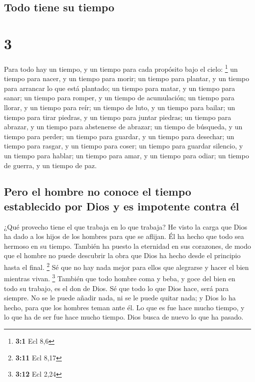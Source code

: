 \hypertarget{todo-tiene-su-tiempo}{%
\subsection{Todo tiene su tiempo}\label{todo-tiene-su-tiempo}}

\hypertarget{section-2}{%
\section{3}\label{section-2}}

 Para todo hay un tiempo, y un tiempo para cada propósito
bajo el cielo: \footnote{\textbf{3:1} Ecl 8,6}  un tiempo
para nacer, y un tiempo para morir; un tiempo para plantar, y un tiempo
para arrancar lo que está plantado;  un tiempo para matar,
y un tiempo para sanar; un tiempo para romper, y un tiempo de
acumulación;  un tiempo para llorar, y un tiempo para
reír; un tiempo de luto, y un tiempo para bailar;  un
tiempo para tirar piedras, y un tiempo para juntar piedras; un tiempo
para abrazar, y un tiempo para abstenerse de abrazar;  un
tiempo de búsqueda, y un tiempo para perder; un tiempo para guardar, y
un tiempo para desechar;  un tiempo para rasgar, y un
tiempo para coser; un tiempo para guardar silencio, y un tiempo para
hablar;  un tiempo para amar, y un tiempo para odiar; un
tiempo de guerra, y un tiempo de paz.

\hypertarget{pero-el-hombre-no-conoce-el-tiempo-establecido-por-dios-y-es-impotente-contra-uxe9l}{%
\subsection{Pero el hombre no conoce el tiempo establecido por Dios y es
impotente contra
él}\label{pero-el-hombre-no-conoce-el-tiempo-establecido-por-dios-y-es-impotente-contra-uxe9l}}

 ¿Qué provecho tiene el que trabaja en lo que trabaja?
 He visto la carga que Dios ha dado a los hijos de los
hombres para que se aflijan.  Él ha hecho que todo sea
hermoso en su tiempo. También ha puesto la eternidad en sus corazones,
de modo que el hombre no puede descubrir la obra que Dios ha hecho desde
el principio hasta el final. \footnote{\textbf{3:11} Ecl 8,17}
 Sé que no hay nada mejor para ellos que alegrarse y
hacer el bien mientras vivan. \footnote{\textbf{3:12} Ecl 2,24}
 También que todo hombre coma y beba, y goce del bien en
todo su trabajo, es el don de Dios.  Sé que todo lo que
Dios hace, será para siempre. No se le puede añadir nada, ni se le puede
quitar nada; y Dios lo ha hecho, para que los hombres teman ante él.
 Lo que es fue hace mucho tiempo, y lo que ha de ser fue
hace mucho tiempo. Dios busca de nuevo lo que ha pasado.

